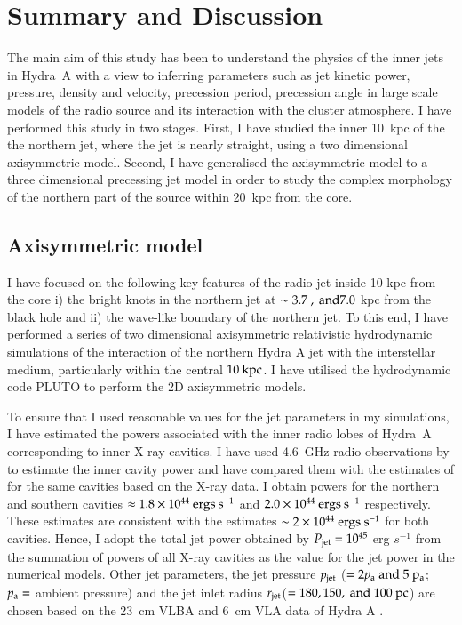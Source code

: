 \chapter{Summary and Discussion}\label{conclusions}

The main aim of this study has been to understand the physics of the inner jets in Hydra~A with a view to inferring parameters such as jet kinetic power, pressure, density and velocity, precession period, precession angle in large scale models of the radio source and its interaction with the cluster atmosphere. I have performed this study in two stages. First, I have studied the inner 10~kpc of the the northern jet, where the jet is nearly straight, using a two dimensional axisymmetric model. Second, I have generalised the axisymmetric model to a three dimensional precessing jet model in order to study the complex morphology of the northern part of the source within 20~kpc from the core. 

\section{Axisymmetric model}
I have focused on the following key features of the radio jet inside 10 kpc from the core i) the bright knots in the northern jet at $\sim 3.7 \rm \ , \ and 7.0$ kpc from the black hole and ii) the wave-like boundary of the northern jet. To this end, I have performed a series of two dimensional axisymmetric relativistic hydrodynamic simulations of the interaction of the northern Hydra A jet with the interstellar medium, particularly within the central $10 \> \rm kpc$. I have utilised the hydrodynamic code PLUTO \citep{mignone07} to perform the 2D axisymmetric models. 

To ensure that I used reasonable values for the jet parameters in my simulations, I have estimated the powers associated with the inner radio lobes of Hydra~A corresponding to inner X-ray cavities. I have used 4.6~GHz radio observations by \citet{taylor90} to estimate the inner cavity power and have compared them with the estimates of \citet{wise07} for the same cavities based on the X-ray data. I obtain powers for the northern and southern cavities $\approx 1.8\times 10^{44} \> \rm ergs \> s^{-1}$ and $2.0\times 10^{44} \> \rm ergs \> s^{-1}$ respectively. These estimates are consistent with the \citet{wise07} estimates $\sim 2 \times 10^{44} \ \rm ergs \ s^{-1}$ for both cavities.
Hence, I adopt the total jet power obtained by \citet{wise07} $P_{\rm jet}=10^{45}$ erg $s^{-1}$ from the summation of powers of all X-ray cavities as the value for the jet power in the numerical models. Other jet parameters, the jet pressure $p_{\rm jet}$ ($= 2 p_{\rm a} \rm \ and \ 5  \ p_{\rm a}$; $p_{\rm a} = $ ambient pressure) and the jet inlet radius $r_{\rm jet}$($=180, 150, \rm \ and \ 100~pc$) are chosen based on the 23~cm VLBA and 6~cm VLA data of Hydra A \citep{taylor90}.

